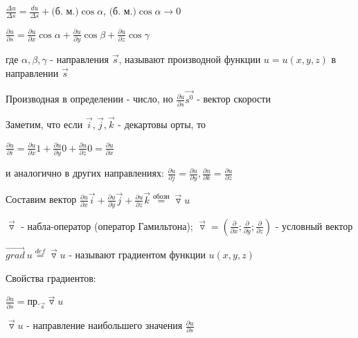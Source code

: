 \documentclass[12pt]{article}
\begin{document}
    $\frac{\Delta u}{\Delta s} = \frac{du}{\Delta s} + \text{(б. м.)} \cos\alpha$, $\text{(б. м.)} \cos\alpha \rightarrow 0$

    \hypertarget{derivativeoffunctionindirection}{}

    \Def $\frac{\partial u}{\partial s} = \frac{\partial u}{\partial x} \cos\alpha + \frac{\partial u}{\partial y} \cos\beta + \frac{\partial u}{\partial z} \cos\gamma$

    где $\alpha, \beta, \gamma$ - направления $\overrightarrow{s}$, называют производной функции $u = u(x, y, z)$ в направлении $\overrightarrow{s}$

    \Nota Производная в определении - число, но $\frac{\partial u}{\partial s} \overrightarrow{s^0}$ - вектор скорости

    \Nota Заметим, что если $\overrightarrow{i}, \overrightarrow{j}, \overrightarrow{k}$ - декартовы орты, то

    $\frac{\partial u}{\partial i} = \frac{\partial u}{\partial x} 1 + \frac{\partial u}{\partial y} 0 + \frac{\partial u}{\partial z} 0 = \frac{\partial u}{\partial x}$

    и аналогично в других направлениях: $\frac{\partial u}{\partial j} = \frac{\partial u}{\partial y}, \frac{\partial u}{\partial k} = \frac{\partial u}{\partial z}$

    Составим вектор $\frac{\partial u}{\partial x} \overrightarrow{i} + \frac{\partial u}{\partial y} \overrightarrow{j} + \frac{\partial u}{\partial z} \overrightarrow{k} \stackrel{\text{обозн}}{=} \overrightarrow{\triangledown} u$

    \hypertarget{gradientdefinition}{}

    $\overrightarrow{\triangledown}$ - набла-оператор (оператор Гамильтона); $\overrightarrow{\triangledown} = \left(\frac{\partial}{\partial x}; \frac{\partial}{\partial y}; \frac{\partial}{\partial z}\right)$ - условный вектор

    \Def $\overrightarrow{grad} \ u \stackrel{def}{=} \overrightarrow{\triangledown} u$ - называют градиентом функции $u(x, y, z)$

    \hypertarget{gradientproperties}{}

    Свойства градиентов:

     $\frac{\partial u}{\partial s} = \text{пр.}_{\overrightarrow{s}} \overrightarrow{\triangledown} u$

     $\overrightarrow{\triangledown} u$ - направление наибольшего значения $\frac{\partial u}{\partial s}$
\end{document}
